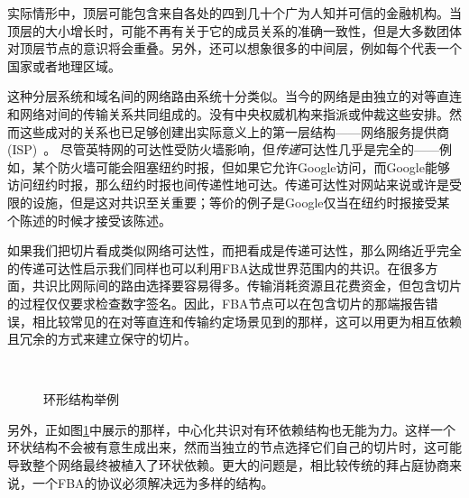 实际情形中，顶层可能包含来自各处的四到几十个广为人知并可信的金融机构。当顶层的大小增长时，可能不再有关于它的成员关系的准确一致性，但是大多数团体对顶层节点的意识将会重叠。另外，还可以想象很多的中间层，例如每个代表一个国家或者地理区域。

这种分层系统和域名间的网络路由系统十分类似。当今的网络是由独立的对等直连和网络对间的传输关系共同组成的。没有中央权威机构来指派或仲裁这些安排。然而这些成对的关系也已足够创建出实际意义上的第一层结构——网络服务提供商(ISP)~\cite{peer_isp2010}。	尽管英特网的可达性受防火墙影响，但\textit{传递}可达性几乎是完全的——例如，某个防火墙可能会阻塞纽约时报，但如果它允许Google访问，而Google能够访问纽约时报，那么纽约时报也间传递性地可达。传递可达性对网站来说或许是受限的设施，但是这对共识至关重要；等价的例子是Google仅当在纽约时报接受某个陈述的时候才接受该陈述。

如果我们把{\quorum}切片看成类似网络可达性，而把{\quorum}看成是传递可达性，那么网络近乎完全的传递可达性启示我们同样也可以利用FBA达成世界范围内的共识。在很多方面，共识比网际间的路由选择要容易得多。传输消耗资源且花费资金，但包含切片的过程仅仅要求检查数字签名。因此，FBA节点可以在包含切片的那端报告错误，相比较常见的在对等直连和传输约定场景见到的那样，这可以用更为相互依赖且冗余的方式来建立保守的切片。


\begin{figure}
\centering
{}\\
\caption{环形{\quorum}结构举例}
\label{fig:cycle}
\end{figure}

另外，正如图\ref{fig:cycle}中展示的那样，中心化共识对有环依赖结构也无能为力。这样一个环状结构不会被有意生成出来，然而当独立的节点选择它们自己的切片时，这可能导致整个网络最终被植入了环状依赖。更大的问题是，相比较传统的拜占庭协商来说，一个FBA的协议必须解决远为多样的{\quorum}结构。